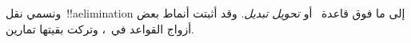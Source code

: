 \documentclass[../../../include/open-logic-section]{subfiles}
\begin{document}
ونسمي نقل~!!a{elimination} إلى ما فوق قاعدة~\Elim{\lor} أو
\Elim{\lexists} \emph{تحويل تبديل}. وقد أثبتت أنماط بعض أزواج القواعد
في~، وتركت بقيتها تمارين.

\end{document}
